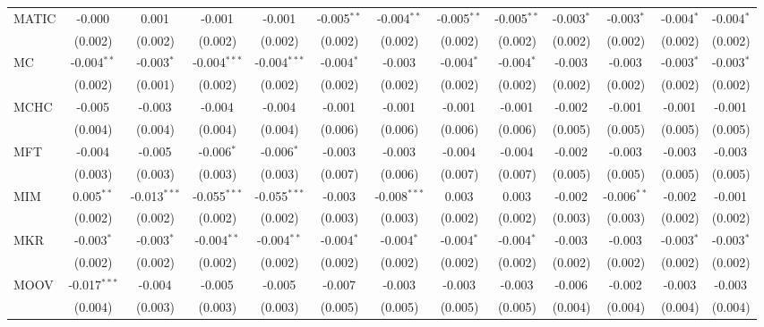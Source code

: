 \begin{table}[!htbp]
\begin{tabular}{@{\extracolsep{5pt}}lcccccccccccc}
 MATIC & -0.000$^{}$ & 0.001$^{}$ & -0.001$^{}$ & -0.001$^{}$ & -0.005$^{**}$ & -0.004$^{**}$ & -0.005$^{**}$ & -0.005$^{**}$ & -0.003$^{*}$ & -0.003$^{*}$ & -0.004$^{*}$ & -0.004$^{*}$ \\
  & (0.002) & (0.002) & (0.002) & (0.002) & (0.002) & (0.002) & (0.002) & (0.002) & (0.002) & (0.002) & (0.002) & (0.002) \\
 MC & -0.004$^{**}$ & -0.003$^{*}$ & -0.004$^{***}$ & -0.004$^{***}$ & -0.004$^{*}$ & -0.003$^{}$ & -0.004$^{*}$ & -0.004$^{*}$ & -0.003$^{}$ & -0.003$^{}$ & -0.003$^{*}$ & -0.003$^{*}$ \\
  & (0.002) & (0.001) & (0.002) & (0.002) & (0.002) & (0.002) & (0.002) & (0.002) & (0.002) & (0.002) & (0.002) & (0.002) \\
 MCHC & -0.005$^{}$ & -0.003$^{}$ & -0.004$^{}$ & -0.004$^{}$ & -0.001$^{}$ & -0.001$^{}$ & -0.001$^{}$ & -0.001$^{}$ & -0.002$^{}$ & -0.001$^{}$ & -0.001$^{}$ & -0.001$^{}$ \\
  & (0.004) & (0.004) & (0.004) & (0.004) & (0.006) & (0.006) & (0.006) & (0.006) & (0.005) & (0.005) & (0.005) & (0.005) \\
 MFT & -0.004$^{}$ & -0.005$^{}$ & -0.006$^{*}$ & -0.006$^{*}$ & -0.003$^{}$ & -0.003$^{}$ & -0.004$^{}$ & -0.004$^{}$ & -0.002$^{}$ & -0.003$^{}$ & -0.003$^{}$ & -0.003$^{}$ \\
  & (0.003) & (0.003) & (0.003) & (0.003) & (0.007) & (0.006) & (0.007) & (0.007) & (0.005) & (0.005) & (0.005) & (0.005) \\
 MIM & 0.005$^{**}$ & -0.013$^{***}$ & -0.055$^{***}$ & -0.055$^{***}$ & -0.003$^{}$ & -0.008$^{***}$ & 0.003$^{}$ & 0.003$^{}$ & -0.002$^{}$ & -0.006$^{**}$ & -0.002$^{}$ & -0.001$^{}$ \\
  & (0.002) & (0.002) & (0.002) & (0.002) & (0.003) & (0.003) & (0.002) & (0.002) & (0.003) & (0.003) & (0.002) & (0.002) \\
 MKR & -0.003$^{*}$ & -0.003$^{*}$ & -0.004$^{**}$ & -0.004$^{**}$ & -0.004$^{*}$ & -0.004$^{*}$ & -0.004$^{*}$ & -0.004$^{*}$ & -0.003$^{}$ & -0.003$^{}$ & -0.003$^{*}$ & -0.003$^{*}$ \\
  & (0.002) & (0.002) & (0.002) & (0.002) & (0.002) & (0.002) & (0.002) & (0.002) & (0.002) & (0.002) & (0.002) & (0.002) \\
 MOOV & -0.017$^{***}$ & -0.004$^{}$ & -0.005$^{}$ & -0.005$^{}$ & -0.007$^{}$ & -0.003$^{}$ & -0.003$^{}$ & -0.003$^{}$ & -0.006$^{}$ & -0.002$^{}$ & -0.003$^{}$ & -0.003$^{}$ \\
  & (0.004) & (0.003) & (0.003) & (0.003) & (0.005) & (0.005) & (0.005) & (0.005) & (0.004) & (0.004) & (0.004) & (0.004) \\

\end{tabular}
\end{table}

